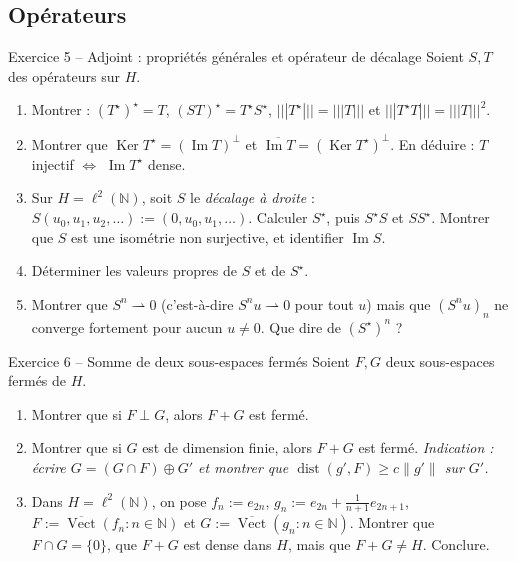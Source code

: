 \documentclass[11pt,a4paper]{article}
\newcommand{\N}{\mathbb{N}}
\newcommand{\adh}[1]{\overline{#1}}
\newcommand{\dist}{\operatorname{dist}}
\newcommand{\Vect}{\operatorname{Vect}}
\newcommand{\norm}[1]{\left\|#1\right\|}
\newcommand{\opnorm}[1]{|\!|\!|#1|\!|\!|}
\newcommand{\ie}{c'est-à-dire}
\DeclareMathOperator{\Ker}{Ker}
\DeclareMathOperator{\Ima}{Im}
\theoremstyle{definition}
\begin{document}
\subsection*{Opérateurs}

\begin{exo}{Exercice 5 -- Adjoint : propriétés générales et opérateur de décalage}
Soient $S,T$ des opérateurs sur $H$.
\begin{enumerate}[label=(\alph*)]
  \item Montrer : $(T^\star)^\star=T$, $(ST)^\star=T^\star S^\star$, $\opnorm{T^\star}=\opnorm T$ et $\opnorm{T^\star T}=\opnorm T^2$.
  \item Montrer que $\Ker T^\star=(\Ima T)^\perp$ et $\adh{\Ima T}=(\Ker T^\star)^\perp$. En déduire : $T$ injectif $\iff$ $\Ima T^\star$ dense.
  \item Sur $H=\ell^2(\N)$, soit $S$ le \emph{décalage à droite} : $S(u_0,u_1,u_2,\dots):=(0,u_0,u_1,\dots)$. Calculer $S^\star$, puis $S^\star S$ et $SS^\star$. Montrer que $S$ est une isométrie non surjective, et identifier $\Ima S$.
  \item Déterminer les valeurs propres de $S$ et de $S^\star$.
  \item Montrer que $S^n\rightharpoonup0$ (\ie{} $S^nu\rightharpoonup0$ pour tout $u$) mais que $(S^nu)_n$ ne converge fortement pour aucun $u\ne0$. Que dire de $(S^\star)^n$ ?
\end{enumerate}
\end{exo}

\begin{exo}{Exercice 6 -- Somme de deux sous-espaces fermés}
Soient $F,G$ deux sous-espaces fermés de $H$.
\begin{enumerate}[label=(\alph*)]
  \item Montrer que si $F\perp G$, alors $F+G$ est fermé.
  \item Montrer que si $G$ est de dimension finie, alors $F+G$ est fermé. \emph{Indication : écrire $G=(G\cap F)\oplus G'$ et montrer que $\dist(g',F)\ge c\norm{g'}$ sur $G'$.}
  \item Dans $H=\ell^2(\N)$, on pose $f_n:=e_{2n}$, $g_n:=e_{2n}+\frac1{n+1}e_{2n+1}$, $F:=\adh{\Vect}(f_n:n\in\N)$ et $G:=\adh{\Vect}(g_n:n\in\N)$. Montrer que $F\cap G=\{0\}$, que $F+G$ est dense dans $H$, mais que $F+G\ne H$. Conclure.
\end{enumerate}
\end{exo}
\end{document}
